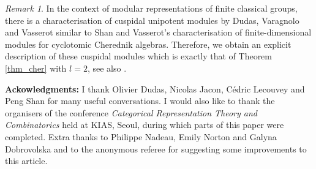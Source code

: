 \documentclass[twoside,12pt]{amsart}
\theoremstyle{plain}
\theoremstyle{remark}
\newtheorem{rem}[num]{Remark}
\begin{document}
\begin{rem}\label{rem_cusp}
In the context of modular representations of finite classical groups, there is a
characterisation of cuspidal unipotent modules by Dudas, Varagnolo and Vasserot \cite[Theorem 5.11]{DudasVaragnoloVasserot2016} similar to Shan and Vasserot's
characterisation of finite-dimensional modules for cyclotomic Cherednik algebras.
Therefore, we obtain an explicit description of these cuspidal modules which is exactly that of Theorem \ref{thm_cher} with $l=2$,
see also \cite[Section 5.5.3]{DudasVaragnoloVasserot2016}.
\end{rem}






\textbf{Ackowledgments:} 
I thank Olivier Dudas, Nicolas Jacon, C\'edric Lecouvey
and Peng Shan for many useful conversations.
I would also like to thank the organisers of the
conference \textit{Categorical Representation Theory and Combinatorics} held at KIAS, Seoul,
during which parts of this paper were completed.
Extra thanks to Philippe Nadeau, Emily Norton and Galyna Dobrovolska and to the anonymous referee for suggesting some 
improvements to this article.



\end{document}
